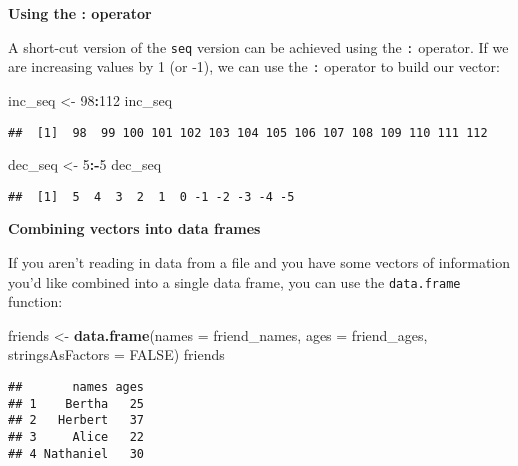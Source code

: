 \documentclass[]{tufte-book}
\newenvironment{Shaded}{\begin{snugshade}}{\end{snugshade}}
\newcommand{\DataTypeTok}[1]{\textcolor[rgb]{0.13,0.29,0.53}{#1}}
\newcommand{\DecValTok}[1]{\textcolor[rgb]{0.00,0.00,0.81}{#1}}
\newcommand{\KeywordTok}[1]{\textcolor[rgb]{0.13,0.29,0.53}{\textbf{#1}}}
\newcommand{\NormalTok}[1]{#1}
\newcommand{\OperatorTok}[1]{\textcolor[rgb]{0.81,0.36,0.00}{\textbf{#1}}}
\newcommand{\OtherTok}[1]{\textcolor[rgb]{0.56,0.35,0.01}{#1}}
\newcommand{\StringTok}[1]{\textcolor[rgb]{0.31,0.60,0.02}{#1}}
\begin{document}
\noindent\textbf{Using the : operator}\vspace*{0.1in}

A short-cut version of the \texttt{seq} version can be achieved using the \texttt{:} operator. If we are increasing values by 1 (or -1), we can use the \texttt{:} operator to build our vector:

\begin{Shaded}
\begin{Highlighting}[]
\NormalTok{inc\_seq <{-}}\StringTok{ }\DecValTok{98}\OperatorTok{:}\DecValTok{112}
\NormalTok{inc\_seq}
\end{Highlighting}
\end{Shaded}

\begin{verbatim}
##  [1]  98  99 100 101 102 103 104 105 106 107 108 109 110 111 112
\end{verbatim}

\begin{Shaded}
\begin{Highlighting}[]
\NormalTok{dec\_seq <{-}}\StringTok{ }\DecValTok{5}\OperatorTok{:{-}}\DecValTok{5}
\NormalTok{dec\_seq}
\end{Highlighting}
\end{Shaded}

\begin{verbatim}
##  [1]  5  4  3  2  1  0 -1 -2 -3 -4 -5
\end{verbatim}

\vspace*{0.2in}

\noindent\textbf{Combining vectors into data frames}\vspace*{0.1in}

If you aren't reading in data from a file and you have some vectors of information you'd like combined into a single data frame, you can use the \texttt{data.frame} function:

\begin{Shaded}
\begin{Highlighting}[]
\NormalTok{friends <{-}}\StringTok{ }\KeywordTok{data.frame}\NormalTok{(}\DataTypeTok{names =}\NormalTok{ friend\_names,}
           \DataTypeTok{ages =}\NormalTok{ friend\_ages,}
           \DataTypeTok{stringsAsFactors =} \OtherTok{FALSE}\NormalTok{)}
\NormalTok{friends}
\end{Highlighting}
\end{Shaded}

\begin{verbatim}
##       names ages
## 1    Bertha   25
## 2   Herbert   37
## 3     Alice   22
## 4 Nathaniel   30
\end{verbatim}
\end{document}
